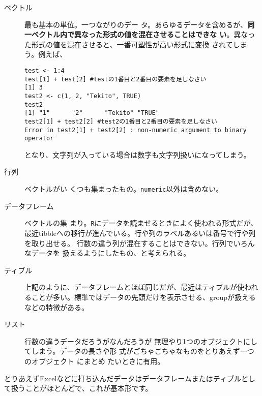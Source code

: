 \begin{description}
 \item[ベクトル]最も基本の単位。一つながりのデー
            タ。あらゆるデータを含めるが、\textbf{同一ベクトル内で異なった形式の値を混在させることはできな
            い}。異なった形式の値を混在させると、一番可塑性が高い形式に変換
            されてしまう。例えば、
\begin{verbatim}
test <- 1:4
test[1] + test[2] #testの1番目と2番目の要素を足しなさい
[1] 3
test2 <- c(1, 2, "Tekito", TRUE)
test2
[1] "1"      "2"      "Tekito" "TRUE"  
test2[1] + test2[2] #test2の1番目と2番目の要素を足しなさい
Error in test2[1] + test2[2] : non-numeric argument to binary operator
\end{verbatim}
となり、文字列が入っている場合は数字も文字列扱いになってしまう。
 \item[行列]ベクトルがい
            くつも集まったもの。\verb|numeric|以外は含めない。
 \item[データフレーム]
            ベクトルの集
            まり。\texttt{R}にデータを読ませるときによく使われる形式だが、最近tibbleへの移行が進んでいる。行や列のラベルあるいは番号で行や列を取り出せる。
            行数の違う列が混在することはできない。行列でいろんなデータを
            扱えるようにしたもの、と考えられる。
 \item[ティブル]
            上記のように、データフレームとほぼ同じだが、最近はティブルが使われることが多い。標準ではデータの先頭だけを表示させる、groupが扱えるなどの特徴がある。
 \item[リスト]行数の違うデータだろうがなんだろうが
            無理やり1つのオブジェクトにしてしまう。データの長さや形
            式がごちゃごちゃなものをとりあえず一つのオブジェクト
            にまとめ
            たいときに有用。
\end{description}
とりあえずExcelなどに打ち込んだデータはデータフレームまたはティブルとして扱うことがほとんどで、これが基本形です。

